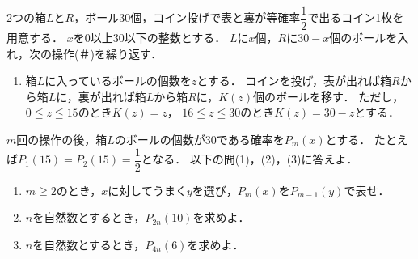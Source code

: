 \documentclass[../../main.tex]{subfiles}
\begin{document}
2つの箱$L$と$R$，ボール30個，コイン投げで表と裏が等確率$\displaystyle\dfrac{1}{2}$で出るコイン1枚を用意する．
$x$を0以上30以下の整数とする．
$L$に$x$個，$R$に$30-x$個のボールを入れ，次の操作(＃)を繰り返す．
\begin{enumerate}
  \item[(＃)]箱$L$に入っているボールの個数を$z$とする．
    コインを投げ，表が出れば箱$R$から箱$L$に，裏が出れば箱$L$から箱$R$に，$K(z)$個のボールを移す．
    ただし，$0 \leqq z \leqq 15$のとき$K(z)=z$，
    $16 \leqq z \leqq 30$のとき$K(z)=30-z$とする．
\end{enumerate}
$m$回の操作の後，箱$L$のボールの個数が30である確率を$P_m(x)$とする．
たとえば$\displaystyle P_1(15)=P_2(15)=\dfrac{1}{2}$となる．
以下の問(1)，(2)，(3)に答えよ．
\begin{enumerate}
  \item $m\geqq2$のとき，$x$に対してうまく$y$を選び，$P_m(x)$を$P_{m-1}(y)$で表せ．
  \item $n$を自然数とするとき，$P_{2n}(10)$を求めよ．
  \item $n$を自然数とするとき，$P_{4n}(6)$を求めよ．
\end{enumerate}
\end{document}
